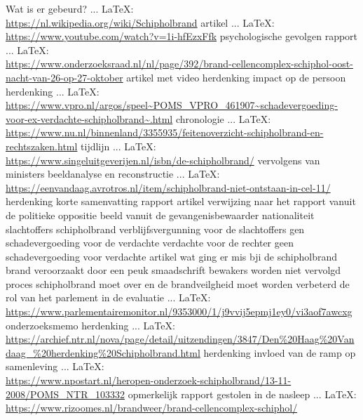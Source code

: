 {{Wat is er gebeurd?
 ... \LaTeX:\\ \url{https://nl.wikipedia.org/wiki/Schipholbrand}
\cite{schipholbrand27102005video}
artikel
 ... \LaTeX:\\ \url{https://www.youtube.com/watch?v=1i-hfEzxFfk}
\cite{schipholbrand27102005video}
psychologische gevolgen
rapport
 ... \LaTeX:\\ \url{https://www.onderzoeksraad.nl/nl/page/392/brand-cellencomplex-schiphol-oost-nacht-van-26-op-27-oktober}
\cite{onderzoeksraad2610schipholoost}
artikel met video
herdenking
impact op de persoon
herdenking
 ... \LaTeX:\\ \url{https://www.vpro.nl/argos/speel~POMS_VPRO_461907~schadevergoeding-voor-ex-verdachte-schipholbrand~.html}
\cite{schipholbrandvideoargos}
chronologie
 ... \LaTeX:\\ \url{https://www.nu.nl/binnenland/3355935/feitenoverzicht-schipholbrand-en-rechtszaken.html}
\cite{nunl30052023feitenoverzicht}
tijdlijn
 ... \LaTeX:\\ \url{https://www.singeluitgeverijen.nl/isbn/de-schipholbrand/}
\cite{}
vervolgens van ministers
beeldanalyse en reconstructie
 ... \LaTeX:\\ \url{https://eenvandaag.avrotros.nl/item/schipholbrand-niet-ontstaan-in-cel-11/}
\cite{}
herdenking
korte samenvatting
rapport
artikel
verwijzing naar het rapport vanuit de politieke oppositie
beeld vanuit de gevangenisbewaarder
nationaliteit slachtoffers schipholbrand
verblijfsvergunning voor de slachtoffers
gen schadevergoeding voor de verdachte
verdachte voor de rechter
geen schadevergoeding voor verdachte
artikel wat ging er mis bji de schipholbrand
brand veroorzaakt door een peuk
smaadschrift
bewakers worden niet vervolgd
proces schipholbrand moet over en de brandveilgheid moet worden verbeterd
de rol van het parlement in de evaluatie
 ... \LaTeX:\\ \url{https://www.parlementairemonitor.nl/9353000/1/j9vvij5epmj1ey0/vi3aof7awcxg}
\cite{parlementairemonitorschipholbrand}
onderzoeksmemo
herdenking
 ... \LaTeX:\\ \url{https://archief.ntr.nl/nova/page/detail/uitzendingen/3847/Den%20Haag%20Vandaag_%20herdenking%20Schipholbrand.html}
\cite{}
herdenking
invloed van de ramp op samenleving
 ... \LaTeX:\\ \url{https://www.npostart.nl/heropen-onderzoek-schipholbrand/13-11-2008/POMS_NTR_103332}
\cite{videonpoNOVA13112008}
opmerkelijk rapport gestolen in de nasleep
 ... \LaTeX:\\ \url{https://www.rizoomes.nl/brandweer/brand-cellencomplex-schiphol/}
\cite{rizoomes01052014schipholbrand}


}}
